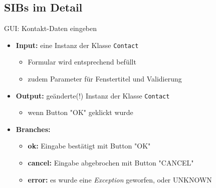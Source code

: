 \subsection*{SIBs im Detail}
\begin{frame}{GUI: Kontakt-Daten eingeben}
\begin{itemize}[<+->]
	\item \textbf{Input:} eine Instanz der Klasse \texttt{Contact}
		\begin{itemize}[<+->]
			\item Formular wird entsprechend befüllt
			\item zudem Parameter für Fenstertitel und Validierung
		\end{itemize}
	\pause
	\item \textbf{Output:} geänderte(!) Instanz der Klasse \texttt{Contact}
		\begin{itemize}[<+->]
			\item wenn Button "OK" geklickt wurde
		\end{itemize}
	\pause
	\item \textbf{Branches:}
		\begin{itemize}[<+->]
			\item \textbf{ok:} Eingabe bestätigt mit Button "OK"
			\item \textbf{cancel:} Eingabe abgebrochen mit Button "CANCEL"
			\item \textbf{error:} es wurde eine \textit{Exception} geworfen, oder UNKNOWN
		\end{itemize}

\end{itemize}
\end{frame}


